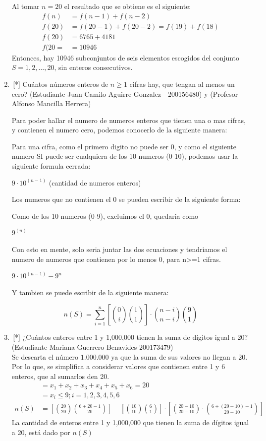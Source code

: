 \begin{enumerate}
Al tomar $n=20$ el resultado que se obtiene es el siguiente:
\begin{align*}
    f(n)&= f(n-1) + f(n-2)\\
    f(20)&= f(20-1) + f(20-2) = f(19) + f(18) \\
    f(20) &= 6765 + 4181 \\ 
    f(20= &= 10946
\end{align*}
Entonces, hay 10946 subconjuntos de seis elementos escogidos del conjunto $S= {1, 2, \dots, 20}$, sin enteros consecutivos.  


\item \,[*] Cuántos números enteros de $n\ge 1$ cifras hay, que tengan al menos un cero?
(Estudiante Juan Camilo Aguirre Gonzalez - 200156480) y (Profesor Alfonso Mancilla Herrera)

Para poder hallar el numero de numeros enteros que tienen una o mas cifras, y contienen el numero cero, podemos conocerlo de la siguiente manera:

Para una cifra, como el primero digito no puede ser 0, y como el siguiente numero SI puede ser cualquiera de los 10 numeros (0-10), podemos usar la siguiente formula cerrada:

$9\cdot 10^{(n-1)}$ (cantidad de numeros enteros)

Los numeros que no contienen el 0 se pueden escribir de la siguiente forma:

Como de los 10 numeros (0-9), excluimos el 0, quedaria como 

$9^{(n)}$

Con esto en mente, solo seria juntar las dos ecuaciones y tendriamos el numero de numeros que contienen por lo menos 0, para n>=1 cifras.

$9\cdot 10^{(n-1)}-9^n$

Y tambien se puede escribir de la siguiente manera:

$$n(S)=\sum_{i=1}^{n}[\binom{0}{i}\binom{1}{1}]\cdot \binom{n-i}{n-i}\binom{9}{1}$$

\item \,[*] ¿Cuántos enteros entre 1 y 1,000,000 tienen la suma de dígitos igual a 20?\\
(Estudiante Mariana Guerrero Benavides-200173479)\\
Se descarta el número $1.000.000$ ya que la suma de sus valores no llegan a 20. Por lo que, se simplifica a considerar valores que contienen entre 1 y 6 enteros, que al sumarlos den 20.\\ 
\begin{align*}
 &= x_1 + x_2 + x_3 + x_4 + x_5 + x_6 = 20\\
 &= x_i\leq 9 ; i=1,2,3,4,5,6 \\
 n(S) &= \left[\binom{20}{20}\binom{6+20-1}{20}\right]-\left[\binom{10}{10}\binom{6}{1}\right]\cdot\left[\binom{20-10}{20-10}\cdot\binom{6+(20-10)-1}{20-10}\right]
\end{align*}
La cantidad de enteros entre 1 y 1,000,000 que tienen la suma de dígitos igual a 20, está dado por $n(S)$
\end{enumerate}




